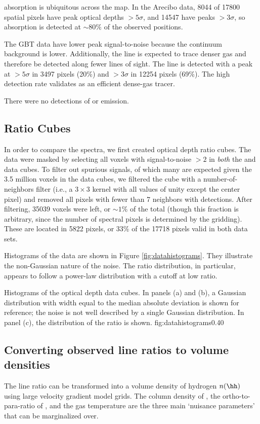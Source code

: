 \formaldehyde absorption is ubiquitous across the map.  In the Arecibo data,
8044 of 17800 spatial pixels have peak optical depths $>5\sigma$, and 14547
have peaks $>3\sigma$, so \formaldehyde absorption is detected at $\sim80\%$ of
the observed positions.

The GBT \formaldehyde \twotwo data have lower peak signal-to-noise because the
continuum background is lower.  Additionally, the \twotwo line is expected to
trace denser gas and therefore be detected along fewer lines of sight.  The
\twotwo line is detected with a peak at $>5\sigma$ in 3497 pixels (20\%) and
$>3\sigma$ in 12254 pixels (69\%).  The high detection rate validates
\formaldehyde as an efficient dense-gas tracer.

There were no detections of \formaldehyde \oneone or \twotwo emission.

\subsection{Ratio Cubes}
In order to compare the \formaldehyde spectra, we first
created optical depth ratio cubes.  The data were masked by selecting all
voxels with signal-to-noise $>2$ in  \emph{both} the \oneone and \twotwo data
cubes.  To filter out spurious signals, of which many are expected given the
3.5 million voxels in the data cubes, we filtered the cube with a
number-of-neighbors filter (i.e., a $3\times3$ kernel with all values of unity
except the center pixel) and removed all pixels with fewer than 7 neighbors
with detections.  After filtering, 35039 voxels were left, or $\sim 1\%$ of the
total (though this fraction is arbitrary, since the number of spectral pixels
is determined by the gridding).  These are located in 5822 pixels, or 33\% of
the 17718 pixels valid in both data sets.

Histograms of the data are shown in Figure \ref{fig:datahistograms}.  They
illustrate the non-Gaussian nature of the noise.  The ratio distribution, in
particular, appears to follow a power-law distribution with a cutoff at low
ratio.

{Histograms of the optical depth data cubes.  In panels (a) and (b),
a Gaussian distribution with width equal to the median absolute deviation
is shown for reference; the noise is not well described by a single Gaussian
distribution.  In panel (c), the distribution of the ratio is shown.}
{fig:datahistograms}{0.4}{0}


\subsection{Converting observed line ratios to volume densities}
\label{sec:models}
The \formaldehyde line ratio can be transformed into a volume
density of hydrogen $n(\hh)$ using large velocity gradient model grids.
The column density of \ortho, the ortho-to-para-ratio of \hh, and the gas
temperature are the three main `nuisance parameters' that can be marginalized
over.


